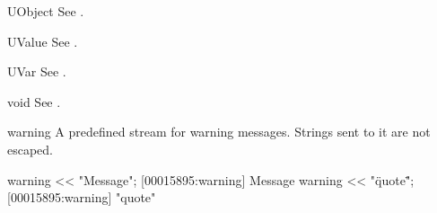 \begin{urbiscriptapi}
\item[UObject] See .

\item[UValue] See .

\item[UVar] See .
\item[void] See .

\item[warning] A predefined stream for warning messages.  Strings sent
  to it are not escaped.
\begin{urbiscript}
warning << "Message";
[00015895:warning] Message
warning << "\"quote\"";
[00015895:warning] "quote"
\end{urbiscript}
\end{urbiscriptapi}

